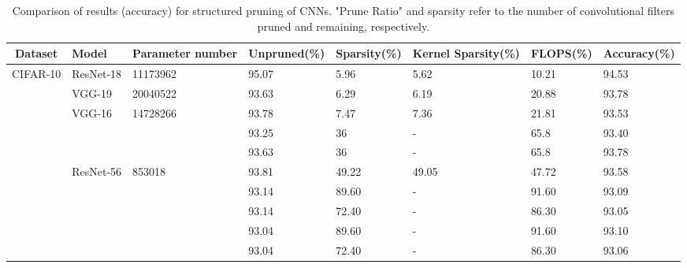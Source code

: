 \begin{table}[!htbp]
	\caption{Comparison of results (accuracy) for structured pruning of CNNs. "Prune Ratio" and sparsity refer to the number of convolutional filters pruned and remaining, respectively. }
	\centering
	\begin{tabular}{c|l|l|l|l|l|l|l}
		\hline
		Dataset & Model & Parameter number &  Unpruned(\%) & Sparsity(\%)& Kernel Sparsity(\%)  & FLOPS(\%) & Accuracy(\%) \\\hline 
		\multirow{10}{*}{CIFAR-10} &  \multirow{1}{*}{ResNet-18} &  \multirow{1}{*}{11173962} & 95.07 & 5.96 & 5.62 & 10.21 & 94.53  \\\cline{2-8}
         &   \multirow{1}{*}{VGG-19}  &\multirow{1}{*}{20040522} & 93.63 &   6.29 &    6.19   & 20.88  &  93.78 \\\cline{2-8} 
         & \multirow{3}{*}{VGG-16}  &\multirow{3}{*}{14728266} & 93.78 &    7.47 &    7.36   & 21.81 &   93.53\\ 
         & & &  93.25 & 36 & - & 65.8 & 93.40 \cite{li2016pruning}\\ 
         & & &  93.63 & 36 & - & 65.8 & 93.78 \cite{liu2018rethinking} \\\cline{2-8} &
         \multirow{5}{*}{ResNet-56} &\multirow{5}{*}{853018} & 93.81 & 49.22 & 49.05 & 47.72 & 93.58 \\ 
         & & & 93.14 & 89.60 & - & 91.60 & 93.09 \cite{liu2018rethinking}\\ 
         & & & 93.14 & 72.40 & - & 86.30 & 93.05 \cite{liu2018rethinking} \\ 
         & & & 93.04 & 89.60 & - & 91.60 & 93.10\cite{li2016pruning} \\ 
         & & & 93.04 & 72.40 & - & 86.30 & 93.06\cite{li2016pruning}\\\hline
\end{tabular}
\end{table}

